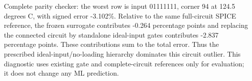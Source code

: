 Complete parity checker: the worst row is input 01111111, corner 94 at 124.5 degrees C, with signed error -3.102\%. Relative to the same full-circuit SPICE reference, the frozen surrogate contributes -0.264 percentage points and replacing the connected circuit by standalone ideal-input gates contributes -2.837 percentage points. These contributions sum to the total error. Thus the prescribed ideal-input/no-loading hierarchy dominates this circuit outlier. This diagnostic uses existing gate and complete-circuit references only for evaluation; it does not change any ML prediction.
